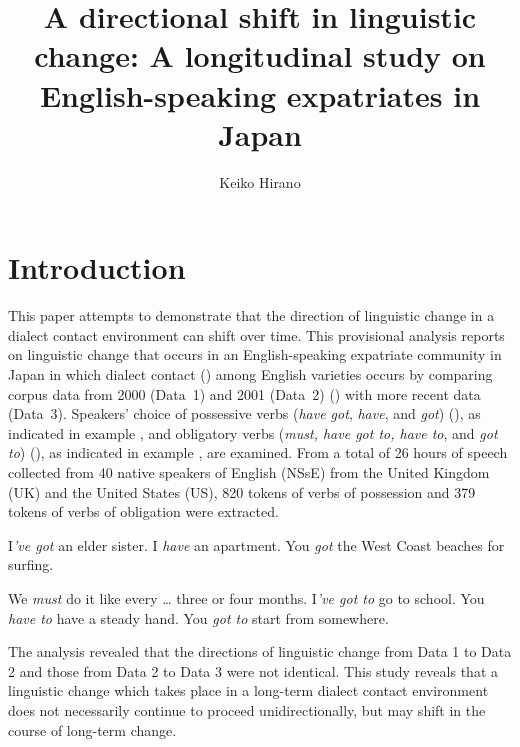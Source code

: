 \documentclass[output=paper,colorlinks,citecolor=brown]{langscibook}
\author{Keiko Hirano\orcid{}\affiliation{The University of Kitakyushu, Japan}}
\title{A directional shift in linguistic change: A longitudinal study on English-speaking expatriates in Japan}
\begin{document}
\maketitle
\label{chap:hirano}
\graphicspath{{figures/hirano}}



\section{Introduction}
\label{sec:hirano:1}%

This paper attempts to demonstrate that the direction of linguistic change in a dialect contact environment can shift over time. This provisional analysis reports on linguistic change that occurs in an English-speaking expatriate community in Japan in which dialect contact (\citealt{Britain2018, Trudgill1986, Trudgill2004}) among English varieties occurs by comparing corpus data from 2000 (Data~1) and 2001 (Data~2) (\citealt{Hirano2013, Hirano2016, HiranoBritain2016, HiranoBritain2020}) with more recent data (Data~3). Speakers’ choice of possessive verbs (\textit{have got}, \textit{have}, and \textit{got}) (\citealt{Hirano2016, HiranoBritain2020}), as indicated in example , and obligatory verbs (\textit{must, have got to, have to}, and \textit{got to}) (\citealt{HiranoBritain2016, HiranoBritain2020}), as indicated in example , are examined. From a total of 26 hours of speech collected from 40 native speakers of English (NSsE) from the United Kingdom (UK) and the United States (US), 820 tokens of verbs of possession and 379 tokens of verbs of obligation were extracted.

\ea%
    \label{ex:hirano:1}
\ea I\textit{’ve got} an elder sister.
\ex I \textit{have} an apartment.
\ex You \textit{got} the West Coast beaches for surfing.
\z
\z

\ea%
    \label{ex:hirano:2}
\ea We \textit{must} do it like every … three or four months.
\ex I\textit{’ve got to} go to school.
\ex You \textit{have to} have a steady hand.
\ex You \textit{got to} start from somewhere.
\z
\z

The analysis revealed that the directions of linguistic change from Data 1 to Data 2 and those from Data 2 to Data 3 were not identical. This study reveals that a linguistic change which takes place in a long-term dialect contact environment does not necessarily continue to proceed unidirectionally, but may shift in the course of long-term change.
\end{document}
